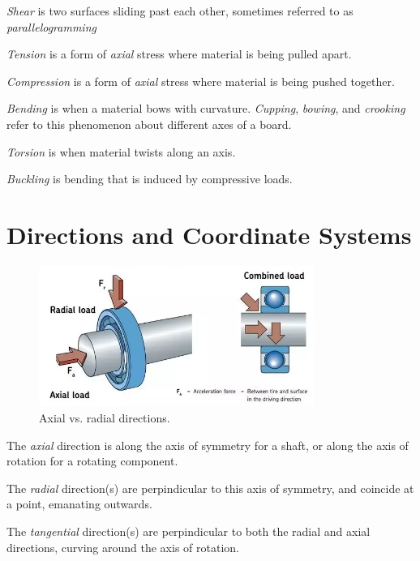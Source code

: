 \begin{asparaenum}[a)]
	\item \textit{Shear} is two surfaces sliding past each other, sometimes referred to as \textit{parallelogramming} 
	\item \textit{Tension} is a form of \textit{axial} stress where material is being pulled apart.  
	\item \textit{Compression} is a form of \textit{axial} stress where material is being pushed together. 
	\item \textit{Bending} is when a material bows with curvature. \textit{Cupping}, \textit{bowing}, and \textit{crooking} refer to this phenomenon about different axes of a board. 
	\item \textit{Torsion} is when material twists along an axis. 
	\item \textit{Buckling} is bending that is induced by compressive loads.
\end{asparaenum}

\section{Directions and Coordinate Systems}
\begin{figure}[H]
\includegraphics[width=0.8\textwidth]{imgs/radial_axial.png}
\caption{Axial vs. radial directions.}
\end{figure}

\begin{asparaenum}[a)]
	\item The \textit{axial} direction is along the axis of symmetry for a shaft, or along the axis of rotation for a rotating component. 
	\item The \textit{radial} direction(s) are perpindicular to this axis of symmetry, and coincide at a point, emanating outwards. 
	\item The \textit{tangential} direction(s) are perpindicular to both the radial and axial directions, curving around the axis of rotation. 
\end{asparaenum}

